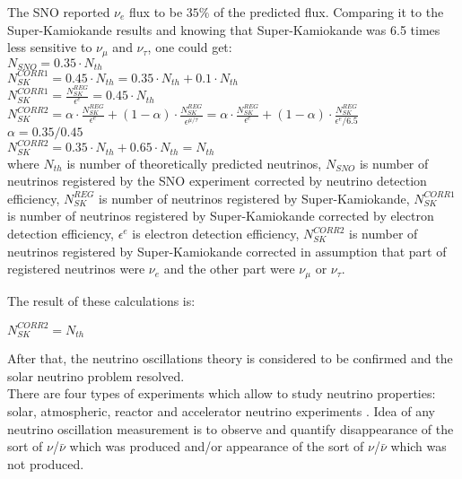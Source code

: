 The SNO reported $\nu_e$ flux to be $35\%$ of the predicted flux. Comparing it to the Super-Kamiokande results and knowing that Super-Kamiokande was 6.5 times less sensitive to $\nu_\mu$ and $\nu_\tau$, one could get:\\
$N_{SNO}=0.35 \cdot N_{th}$\\
$N_{SK}^{CORR1}=0.45 \cdot N_{th}=0.35 \cdot N_{th}+0.1 \cdot N_{th}$\\
$N_{SK}^{CORR1}=\frac{N_{SK}^{REG}}{\epsilon^{e}}=0.45 \cdot N_{th} $\\
$N_{SK}^{CORR2}=\alpha \cdot \frac{N_{SK}^{REG}}{\epsilon^{e}}+(1-\alpha) \cdot \frac{N_{SK}^{REG}}{\epsilon^{\mu/\tau}}=\alpha \cdot \frac{N_{SK}^{REG}}{\epsilon^{e}}+(1-\alpha) \cdot \frac{N_{SK}^{REG}}{\epsilon^{e}/6.5}$\\
$\alpha=0.35/0.45$\\
$N_{SK}^{CORR2}=0.35 \cdot N_{th}+0.65 \cdot N_{th}=N_{th}$\\
where $N_{th}$ is number of theoretically predicted neutrinos, $N_{SNO}$ is number of neutrinos registered by the SNO experiment corrected by neutrino detection efficiency, $N_{SK}^{REG}$ is number of neutrinos registered by Super-Kamiokande, $N_{SK}^{CORR1}$ is number of neutrinos registered by Super-Kamiokande corrected by electron detection efficiency, $\epsilon^{e}$ is electron detection efficiency, $N_{SK}^{CORR2}$ is number of neutrinos registered by Super-Kamiokande corrected in assumption that part of registered neutrinos were $\nu_e$ and the other part were $\nu_\mu$ or $\nu_\tau$.

The result of these calculations is:\\
\begin{center}
$N_{SK}^{CORR2}=N_{th}$\\
\end{center}

After that, the neutrino oscillations theory is considered to be confirmed and the solar neutrino problem resolved.\\



There are four types of experiments which allow to study neutrino properties: solar, atmospheric, reactor and accelerator neutrino experiments \cite{ref_PDG}. Idea of any neutrino oscillation measurement is to observe and quantify disappearance of the sort of $\nu$/$\bar{\nu}$ which was produced and/or appearance of the sort of $\nu$/$\bar{\nu}$ which was not produced.\\

